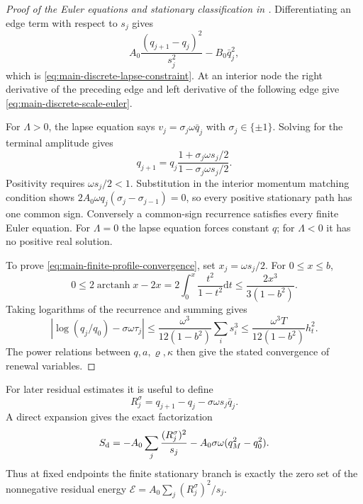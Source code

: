 \documentclass[11pt]{article}
\numberwithin{equation}{section}
\theoremstyle{definition}
\theoremstyle{remark}
\newcommand{\dd}{\mathrm d}
\begin{document}
\begin{proof}[Proof of the Euler equations and stationary classification in
]
Differentiating an edge term with respect to $s_j$ gives
\[
 A_0\frac{(q_{j+1}-q_j)^2}{s_j^2}-B_0\bar q_j^2,
\]
which is \eqref{eq:main-discrete-lapse-constraint}.  At an interior node the
right derivative of the preceding edge and left derivative of the following
edge give \eqref{eq:main-discrete-scale-euler}.

For $\Lambda>0$, the lapse equation says
$v_j=\sigma_j\omega\bar q_j$ with $\sigma_j\in\{\pm1\}$.  Solving for the
terminal amplitude gives
\[
 q_{j+1}=q_j\frac{1+\sigma_j\omega s_j/2}
                      {1-\sigma_j\omega s_j/2}.
\]
Positivity requires $\omega s_j/2<1$.  Substitution in the interior momentum
matching condition shows
$2A_0\omega q_j(\sigma_j-\sigma_{j-1})=0$, so every positive stationary path
has one common sign.  Conversely a common-sign recurrence satisfies every
finite Euler equation.  For $\Lambda=0$ the lapse equation forces constant
$q$; for $\Lambda<0$ it has no positive real solution.

To prove \eqref{eq:main-finite-profile-convergence}, set
$x_j=\omega s_j/2$.  For $0\le x\le b$,
\[
 0\le2\operatorname{arctanh}x-2x
 =2\int_0^x\frac{t^2}{1-t^2}\dd t
 \le\frac{2x^3}{3(1-b^2)}.
\]
Taking logarithms of the recurrence and summing gives
\[
 \left|\log(q_j/q_0)-\sigma\omega\tau_j\right|
 \le\frac{\omega^3}{12(1-b^2)}\sum_i s_i^3
 \le\frac{\omega^3T}{12(1-b^2)}h_t^2.
\]
The power relations between $q,a,\varrho,\kappa$ then give the stated
convergence of renewal variables.
\end{proof}

For later residual estimates it is useful to define
\begin{equation}
 R_j^\sigma=q_{j+1}-q_j-\sigma\omega s_j\bar q_j.
 \label{eq:supp-homogeneous-residual}
\end{equation}
A direct expansion gives the exact factorization
\begin{equation}
 S_{\rm d}=-A_0\sum_j\frac{(R_j^\sigma)^2}{s_j}
 -A_0\sigma\omega(q_M^2-q_0^2).
 \label{eq:supp-homogeneous-square-factor}
\end{equation}
Thus at fixed endpoints the finite stationary branch is exactly the zero set of
the nonnegative residual energy
$\mathcal E=A_0\sum_j(R_j^\sigma)^2/s_j$.
\end{document}

